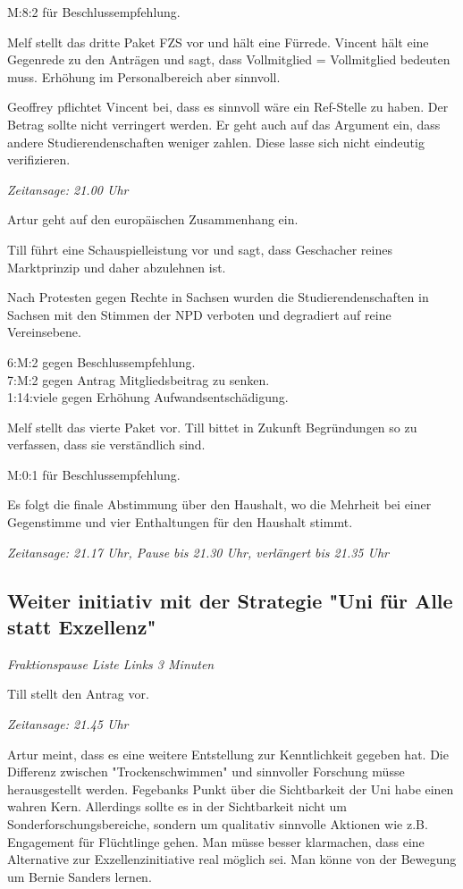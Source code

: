 \documentclass[ngerman,headheight=70pt]{scrartcl}
\begin{document}
    M:8:2 für Beschlussempfehlung.

    Melf stellt das dritte Paket FZS vor und hält eine Fürrede. Vincent hält
    eine Gegenrede zu den Anträgen und sagt, dass Vollmitglied = Vollmitglied
    bedeuten muss. Erhöhung im Personalbereich aber sinnvoll.

    Geoffrey pflichtet Vincent bei, dass es sinnvoll wäre ein Ref-Stelle zu haben.
    Der Betrag sollte nicht verringert werden. Er geht auch auf das Argument ein,
    dass andere Studierendenschaften weniger zahlen. Diese lasse sich nicht
    eindeutig verifizieren.

    \textit{Zeitansage: 21.00 Uhr}

    Artur geht auf den europäischen Zusammenhang ein.

    Till führt eine Schauspielleistung vor und sagt, dass Geschacher reines
    Marktprinzip und daher abzulehnen ist.

    Nach Protesten gegen Rechte in Sachsen wurden die Studierendenschaften
    in Sachsen mit den Stimmen der NPD verboten und degradiert auf reine
    Vereinsebene.

    6:M:2 gegen Beschlussempfehlung. \\
    7:M:2 gegen Antrag Mitgliedsbeitrag zu senken. \\
    1:14:viele gegen Erhöhung Aufwandsentschädigung.

    Melf stellt das vierte Paket vor. Till bittet in Zukunft Begründungen
    so zu verfassen, dass sie verständlich sind.

    M:0:1 für Beschlussempfehlung.

    Es folgt die finale Abstimmung über den Haushalt, wo die Mehrheit
    bei einer Gegenstimme und vier Enthaltungen für den Haushalt stimmt.

    \textit{Zeitansage: 21.17 Uhr, Pause bis 21.30 Uhr, verlängert bis 21.35 Uhr}

    \subsection{Weiter initiativ mit der Strategie "Uni für Alle statt Exzellenz"}

    \textit{Fraktionspause Liste Links 3 Minuten}

    Till stellt den Antrag vor.

    \textit{Zeitansage: 21.45 Uhr}

    Artur meint, dass es eine weitere Entstellung zur Kenntlichkeit
    gegeben hat.
    Die Differenz zwischen "Trockenschwimmen" und sinnvoller Forschung müsse
    herausgestellt werden. Fegebanks Punkt über die Sichtbarkeit der Uni habe
    einen wahren Kern. Allerdings sollte es in der Sichtbarkeit nicht um
    Sonderforschungsbereiche, sondern um qualitativ sinnvolle Aktionen wie z.B.
    Engagement für Flüchtlinge gehen.
    Man müsse besser klarmachen, dass eine Alternative zur Exzellenzinitiative
    real möglich sei. Man könne von der Bewegung um Bernie Sanders lernen.
\end{document}

